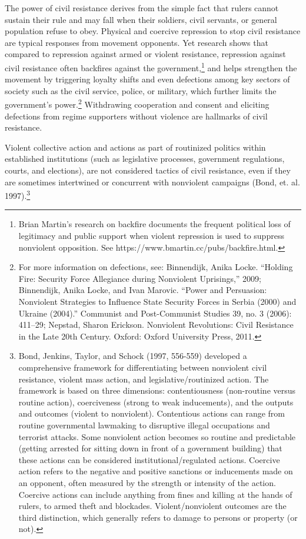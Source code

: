 \documentclass[twoside,a4paper,12pt,fleqn,openany]{extbook}
\begin{document}
The power of civil resistance derives from the simple fact that rulers cannot sustain their rule and may fall when their soldiers, civil servants, or general population refuse to obey. Physical and coercive repression to stop civil resistance are typical responses from movement opponents. Yet research shows that compared to repression against armed or violent resistance, repression against civil resistance often backfires against the government,\footnote{Brian Martin’s research on backfire documents the frequent political loss of legitimacy and public support when violent repression is used to suppress nonviolent opposition. See https://www.bmartin.cc/pubs/backfire.html.} and helps strengthen the movement by triggering loyalty shifts and even defections among key sectors of society such as the civil service, police, or military, which further limits the government’s power.\footnote{For more information on defections, see: Binnendijk, Anika Locke. “Holding Fire: Security Force Allegiance during Nonviolent Uprisings,” 2009; Binnendijk, Anika Locke, and Ivan Marovic. “Power and Persuasion: Nonviolent Strategies to Influence State Security Forces in Serbia (2000) and Ukraine (2004).” Communist and Post-Communist Studies 39, no. 3 (2006): 411–29; Nepstad, Sharon Erickson. Nonviolent Revolutions: Civil Resistance in the Late 20th Century. Oxford: Oxford University Press, 2011.} Withdrawing cooperation and consent and eliciting defections from regime supporters without violence are hallmarks of civil resistance.

Violent collective action and actions as part of routinized politics within established institutions (such as legislative processes, government regulations, courts, and elections), are not considered tactics of civil resistance, even if they are sometimes intertwined or concurrent with nonviolent campaigns (Bond, et. al. 1997).\footnote{Bond, Jenkins, Taylor, and Schock (1997, 556-559) developed a comprehensive framework for differentiating between nonviolent civil resistance, violent mass action, and legislative/routinized action. The framework is based on three dimensions: contentiousness (non-routine versus routine action), coerciveness (strong to weak inducements), and the outputs and outcomes (violent to nonviolent). Contentious actions can range from routine governmental lawmaking to disruptive illegal occupations and terrorist attacks. Some nonviolent action becomes so routine and predictable (getting arrested for sitting down in front of a government building) that these actions can be considered institutional/regulated actions. Coercive action refers to the negative and positive sanctions or inducements made on an opponent, often measured by the strength or intensity of the action. Coercive actions can include anything from fines and killing at the hands of rulers, to armed theft and blockades. Violent/nonviolent outcomes are the third distinction, which generally refers to damage to persons or property (or not).}
\end{document}
